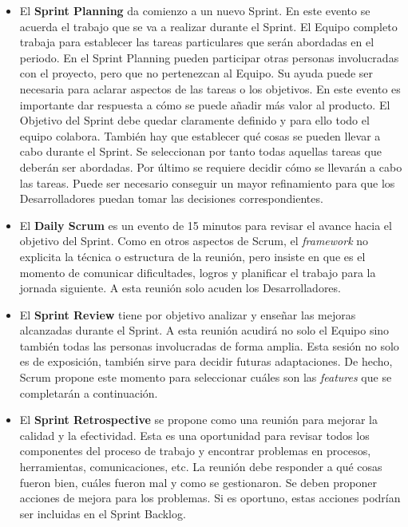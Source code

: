 \begin{itemize}
    \item El \textbf{Sprint Planning} da comienzo a un nuevo Sprint. En este evento se acuerda el trabajo que se va a realizar durante el Sprint. El Equipo completo trabaja para establecer las tareas particulares que serán abordadas en el periodo. En el Sprint Planning pueden participar otras personas involucradas con el proyecto, pero que no pertenezcan al Equipo. Su ayuda puede ser necesaria para aclarar aspectos de las tareas o los objetivos.
    En este evento es importante dar respuesta a cómo se puede añadir más valor al producto. El Objetivo del Sprint debe quedar claramente definido y para ello todo el equipo colabora. También hay que establecer qué cosas se pueden llevar a cabo durante el Sprint. Se seleccionan por tanto todas aquellas tareas que deberán ser abordadas. Por último se requiere decidir cómo se llevarán a cabo las tareas. Puede ser necesario conseguir un mayor refinamiento para que los Desarrolladores puedan tomar las decisiones correspondientes.

    \item El \textbf{Daily Scrum} es un evento de 15 minutos para revisar el avance hacia el objetivo del Sprint. Como en otros aspectos de Scrum, el \emph{framework} no explicita la técnica o estructura de la reunión, pero insiste en que es el momento de comunicar dificultades, logros y planificar el trabajo para la jornada siguiente. A esta reunión solo acuden los Desarrolladores.
    
    \item El \textbf{Sprint Review} tiene por objetivo analizar y enseñar las mejoras alcanzadas durante el Sprint. A esta reunión acudirá no solo el Equipo sino también todas las personas involucradas de forma amplia. Esta sesión no solo es de exposición, también sirve para decidir futuras adaptaciones. De hecho, Scrum propone este momento para seleccionar cuáles son las \emph{features} que se completarán a continuación.
    
    \item El \textbf{Sprint Retrospective} se propone como una reunión para mejorar la calidad y la efectividad. Esta es una oportunidad para revisar todos los componentes del proceso de trabajo y encontrar problemas en procesos, herramientas, comunicaciones, etc. La reunión debe responder a qué cosas fueron bien, cuáles fueron mal y como se gestionaron. Se deben proponer acciones de mejora para los problemas. Si es oportuno, estas acciones podrían ser incluidas en el Sprint Backlog.
\end{itemize}

